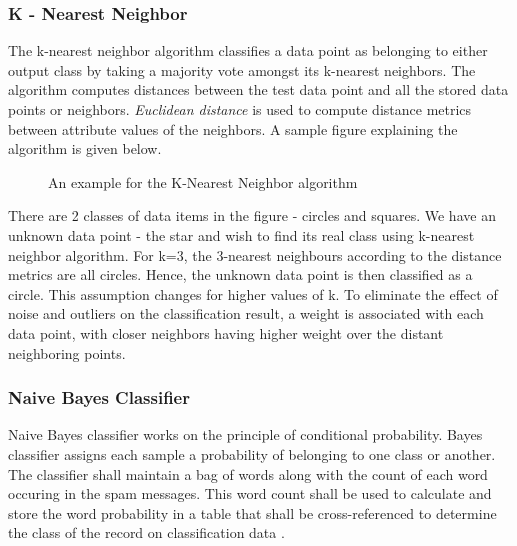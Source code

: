 \documentclass[9pt,twocolumn,twoside]{../../styles/osajnl}
\begin{document}
\subsubsection{K - Nearest Neighbor}
The k-nearest neighbor algorithm classifies a data point as belonging
to either output class by taking a majority vote amongst its k-nearest
neighbors. The algorithm computes distances between the test data
point and all the stored data points or neighbors. \emph{Euclidean
  distance} \cite{www-wiki-euclidean_distance} is used to compute
distance metrics between attribute values of the neighbors. A sample
figure explaining the algorithm is given below.

\begin{figure}[htbp]
\centering
{}
\caption{An example for the K-Nearest Neighbor algorithm \cite{www-knn-introduction}}
\label{fig: An example for the K-Nearest Neighbor algorithm}
\end{figure}

There are 2 classes of data items in the figure - circles and
squares. We have an unknown data point - the star and wish to find its
real class using k-nearest neighbor algorithm. For k=3, the 3-nearest
neighbours according to the distance metrics are all circles. Hence,
the unknown data point is then classified as a circle. This assumption
changes for higher values of k. To eliminate the effect of noise and
outliers on the classification result, a weight is associated with
each data point, with closer neighbors having higher weight over the
distant neighboring points.

\subsubsection{Naive Bayes Classifier}

Naive Bayes classifier works on the principle of conditional
probability. Bayes classifier assigns each sample a probability of
belonging to one class or another. The classifier shall maintain a bag
of words along with the count of each word occuring in the spam
messages. This word count shall be used to calculate and store the
word probability in a table that shall be cross-referenced to
determine the class of the record on classification data
\cite{paper-classification-of-email}.
\end{document}
